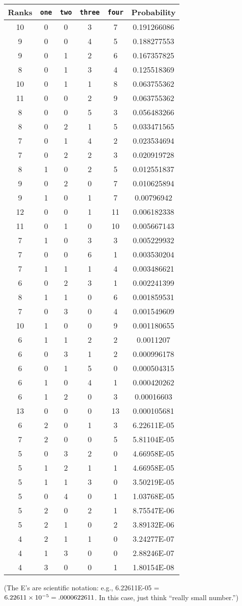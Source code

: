 \begin{center}
\begin{tabular}{c|cccc|c}
\textbf{Ranks} & \texttt{one} & \texttt{two} & \texttt{three} & \texttt{four} & \textbf{Probability}\\ \hline
10 & 0 & 0 & 3 & 7 & 0.191266086\\
9 & 0 & 0 & 4 & 5 & 0.188277553\\
9 & 0 & 1 & 2 & 6 & 0.167357825\\
8 & 0 & 1 & 3 & 4 & 0.125518369\\
10 & 0 & 1 & 1 & 8 & 0.063755362\\
11 & 0 & 0 & 2 & 9 & 0.063755362\\
8 & 0 & 0 & 5 & 3 & 0.056483266\\
8 & 0 & 2 & 1 & 5 & 0.033471565\\
7 & 0 & 1 & 4 & 2 & 0.023534694\\
7 & 0 & 2 & 2 & 3 & 0.020919728\\
8 & 1 & 0 & 2 & 5 & 0.012551837\\
9 & 0 & 2 & 0 & 7 & 0.010625894\\
9 & 1 & 0 & 1 & 7 & 0.00796942\\
12 & 0 & 0 & 1 & 11 & 0.006182338\\
11 & 0 & 1 & 0 & 10 & 0.005667143\\
7 & 1 & 0 & 3 & 3 & 0.005229932\\
7 & 0 & 0 & 6 & 1 & 0.003530204\\
7 & 1 & 1 & 1 & 4 & 0.003486621\\
6 & 0 & 2 & 3 & 1 & 0.002241399\\
8 & 1 & 1 & 0 & 6 & 0.001859531\\
7 & 0 & 3 & 0 & 4 & 0.001549609\\
10 & 1 & 0 & 0 & 9 & 0.001180655\\
6 & 1 & 1 & 2 & 2 & 0.0011207\\
6 & 0 & 3 & 1 & 2 & 0.000996178\\
6 & 0 & 1 & 5 & 0 & 0.000504315\\
6 & 1 & 0 & 4 & 1 & 0.000420262\\
6 & 1 & 2 & 0 & 3 & 0.00016603\\
13 & 0 & 0 & 0 & 13 & 0.000105681\\
6 & 2 & 0 & 1 & 3 & 6.22611E-05\\
7 & 2 & 0 & 0 & 5 & 5.81104E-05\\
5 & 0 & 3 & 2 & 0 & 4.66958E-05\\
5 & 1 & 2 & 1 & 1 & 4.66958E-05\\
5 & 1 & 1 & 3 & 0 & 3.50219E-05\\
5 & 0 & 4 & 0 & 1 & 1.03768E-05\\
5 & 2 & 0 & 2 & 1 & 8.75547E-06\\
5 & 2 & 1 & 0 & 2 & 3.89132E-06\\
4 & 2 & 1 & 1 & 0 & 3.24277E-07\\
4 & 1 & 3 & 0 & 0 & 2.88246E-07\\
4 & 3 & 0 & 0 & 1 & 1.80154E-08
\end{tabular}
\end{center}

(The E's are scientific notation: e.g., 6.22611E-05 = $6.22611\times10^{-5}=.0000622611$.
In this case, just think ``really small number.'')
